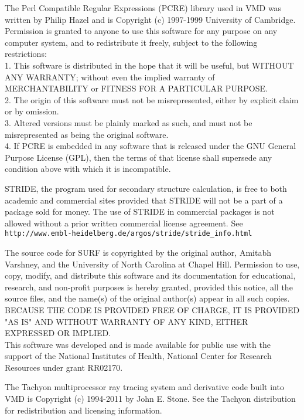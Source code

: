 \begin{itemize}
The Perl Compatible Regular Expressions (PCRE) library used in VMD
was written by Philip Hazel and is Copyright (c) 1997-1999 
University of Cambridge.  
\\
Permission is granted to anyone to use this software for any purpose on any
computer system, and to redistribute it freely, subject to the following
restrictions:
\\
1. This software is distributed in the hope that it will be useful,
   but WITHOUT ANY WARRANTY; without even the implied warranty of
   MERCHANTABILITY or FITNESS FOR A PARTICULAR PURPOSE.
\\
2. The origin of this software must not be misrepresented, either by
   explicit claim or by omission.
\\
3. Altered versions must be plainly marked as such, and must not be
   misrepresented as being the original software.
\\
4. If PCRE is embedded in any software that is released under the GNU
   General Purpose License (GPL), then the terms of that license shall
   supersede any condition above with which it is incompatible.

STRIDE, the program used for secondary structure calculation, is
free to both academic and commercial sites provided that STRIDE will
not be a part of a package sold for money.  The use of STRIDE in
commercial packages is not allowed without a prior written
commercial license agreement.  See
{\tt http://www.embl-heidelberg.de/argos/stride/stride\_info.html}

The source code for SURF is copyrighted by the original author,
Amitabh Varshney, and the University of North Carolina at Chapel Hill.
Permission to use, copy, modify, and distribute this software and its
documentation for educational, research, and non-profit purposes is
hereby granted, provided this notice, all the source files, and the
name(s) of the original author(s) appear in all such copies.
\\
BECAUSE THE CODE IS PROVIDED FREE OF CHARGE, IT IS PROVIDED "AS IS" AND
WITHOUT WARRANTY OF ANY KIND, EITHER EXPRESSED OR IMPLIED.
\\
This software was developed and is made available for public use with
the support of the National Institutes of Health, National Center for
Research Resources under grant RR02170.

The Tachyon multiprocessor ray tracing system and derivative code built
into VMD is Copyright (c) 1994-2011 by John E. Stone.
See the Tachyon distribution for redistribution and licensing information.


\end{itemize}
